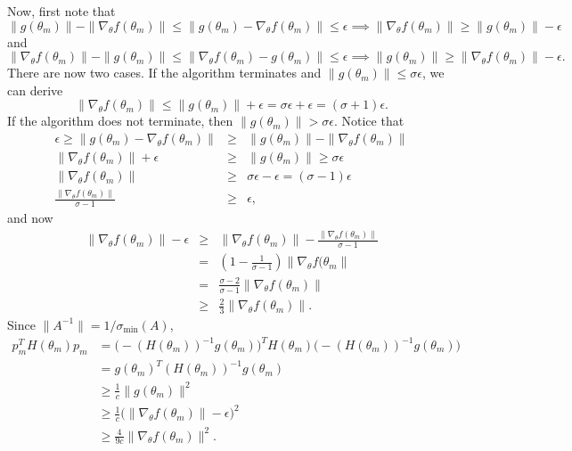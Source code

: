 Now, first note that
\begin{equation}
\|g(\theta_m)\| - \|\nabla_\theta f(\theta_m)\| \leq \|g(\theta_m) - \nabla_\theta f(\theta_m)\| \leq \epsilon \implies \|\nabla_\theta f(\theta_m)\| \geq \|g(\theta_m)\| - \epsilon
\end{equation} 
and
\begin{equation}
\|\nabla_\theta f(\theta_m)\|-\|g(\theta_m)\| \leq \|\nabla_\theta f(\theta_m)-g(\theta_m)\| \leq \epsilon \implies \|g(\theta_m)\| \geq \|\nabla_\theta f(\theta_m)\| - \epsilon.
\end{equation}
There are now two cases. 
If the algorithm terminates and $\|g(\theta_m)\| \leq \sigma \epsilon$, we can derive 
\begin{equation}
    \|\nabla_\theta f(\theta_m)\| \leq \|g(\theta_m)\| + \epsilon = \sigma\epsilon+\epsilon = (\sigma+1)\epsilon.
\end{equation}
If the algorithm does not terminate, then $\|g(\theta_m)\| > \sigma \epsilon$. 
Notice that 
\begin{eqnarray}
    \epsilon \geq \|g(\theta_m) - \nabla_\theta f(\theta_m)\| &\geq& \|g(\theta_m)\| - \|\nabla_\theta f(\theta_m)\| 
    \\
    \|\nabla_\theta f(\theta_m)\| + \epsilon &\geq& \|g(\theta_m)\| \geq \sigma \epsilon 
    \\
    \|\nabla_\theta f(\theta_m)\| &\geq& \sigma \epsilon - \epsilon = (\sigma - 1)\epsilon 
    \\
    \frac{\|\nabla_\theta f(\theta_m)\|}{\sigma-1} &\geq& \epsilon,
\end{eqnarray}
and now 
\begin{eqnarray}
    \|\nabla_\theta f(\theta_m)\| - \epsilon
    &\geq&  \|\nabla_\theta f(\theta_m)\| - \frac{\|\nabla_\theta f(\theta_m)\|}{\sigma-1} 
    \\
    &=& \left(1-\frac{1}{\sigma-1}\right)\|\nabla_\theta f(\theta_m\| 
    \\
    &=& \frac{\sigma-2}{\sigma-1}\|\nabla_\theta f(\theta_m)\| 
    \\
    &\geq& \frac{2}{3}\|\nabla_\theta f(\theta_m)\|.
\end{eqnarray}
Since $\|A^{-1}\| = 1/\sigma_{\min}(A)$,
\begin{align}
    p_m^TH(\theta_m)p_m &= \big(-(H(\theta_m))^{-1}g(\theta_m)\big)^TH(\theta_m)\big(-(H(\theta_m))^{-1}g(\theta_m)\big) \\
    &= g(\theta_m)^T(H(\theta_m))^{-1}g(\theta_m) \\
    &\geq \frac{1}{c}\|g(\theta_m)\|^2 \\
    &\geq \frac{1}{c}\big(\|\nabla_\theta f(\theta_m)\| - \epsilon\big)^2 \\
    &\geq \frac{4}{9c}\|\nabla_\theta f(\theta_m)\|^2.
\end{align}
